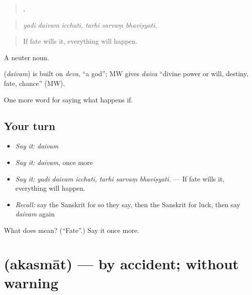 \begin{quote}
  ,   
\end{quote}

\begin{quote}
\emph{yadi daivam icchati, tarhi sarvaṃ bhaviṣyati.}
\end{quote}

\begin{quote}
If fate wills it, everything will happen.
\end{quote}

A neuter noun.

\begin{cousinweb}
\textbf{} (\emph{daivam}) is built on \emph{deva}, \textquotedblleft{}a god\textquotedblright{}; MW gives \emph{daiva} \textquotedblleft{}divine power or will, destiny, fate, chance\textquotedblright{} (MW).
\end{cousinweb}

\begin{grammarlens}[title={What you've built}]
One more word for saying what happens if.
\end{grammarlens}

\subsection*{Your turn}
\begin{itemize}
\raggedright
  \item \emph{Say it:} \emph{daivam}
  \item \emph{Say it:} \emph{daivam}, once more
  \item \emph{Say it:} \emph{yadi daivam icchati, tarhi sarvaṃ bhaviṣyati.} — If fate wills it, everything will happen.
  \item \emph{Recall:} say the Sanskrit for so they say, then the Sanskrit for luck, then say \emph{daivam} again
\end{itemize}

\begin{tcolorbox}[breakable,colback=teal!4,colframe=teal!35!black,title={Before you move on}]
What does  mean? (\textquotedblleft{}Fate\textquotedblright{}.) Say it once more.
\end{tcolorbox}
\section[\texorpdfstring{\sk{अकस्मात्} (akasmāt)}{अकस्मात् (akasmāt)}]{ (akasmāt) — by accident; without warning}

